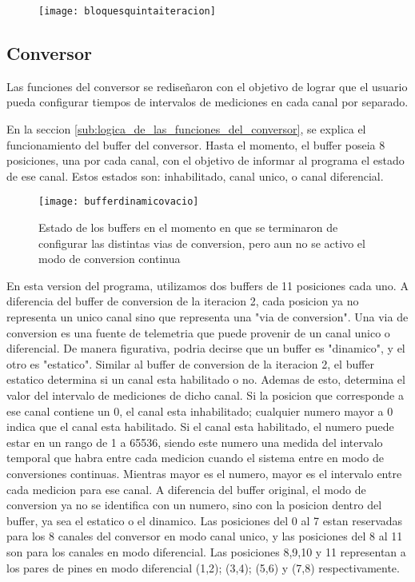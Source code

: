 \begin{figure}[h]
  \centering
  \texttt{[image: bloquesquintaiteracion]}
  \caption{}\label{fig:bloquesquintaiteracion}
\end{figure}

\subsection{Conversor} %
\label{sub:conversor}

Las funciones del conversor se rediseñaron con el objetivo de lograr que el usuario pueda configurar tiempos de intervalos de mediciones en cada canal por separado.

En la seccion \ref{sub:logica_de_las_funciones_del_conversor}, se explica el funcionamiento del buffer del conversor. Hasta el momento, el buffer poseia 8 posiciones, una por cada canal, con el objetivo de informar al programa el estado de ese canal. Estos estados son: inhabilitado, canal unico, o canal diferencial.

\begin{figure}[h]
  \centering
  \texttt{[image: bufferdinamicovacio]}
  \caption{Estado de los buffers en el momento en que se terminaron de configurar las distintas vias de conversion, pero aun no se activo el modo de conversion continua}\label{fig:bufferdinamicovacio}
\end{figure}

En esta version del programa, utilizamos dos buffers de 11 posiciones cada uno. A diferencia del buffer de conversion de la iteracion 2, cada posicion ya no representa un unico canal sino que representa una "via de conversion". Una via de conversion es una fuente de telemetria que puede provenir de un canal unico o diferencial.
De manera figurativa, podria decirse que un buffer es "dinamico", y el otro es "estatico". Similar al buffer de conversion de la iteracion 2, el buffer estatico determina si un canal esta habilitado o no. Ademas de esto, determina el valor del intervalo de mediciones de dicho canal. Si la posicion que corresponde a ese canal contiene un 0, el canal esta inhabilitado; cualquier numero mayor a 0 indica que el canal esta habilitado. Si el canal esta habilitado, el numero puede estar en un rango de 1 a 65536, siendo este numero una medida del intervalo temporal que habra entre cada medicion cuando el sistema entre en modo de conversiones continuas. Mientras mayor es el numero, mayor es el intervalo entre cada medicion para ese canal.
A diferencia del buffer original, el modo de conversion ya no se identifica con un numero, sino con la posicion dentro del buffer, ya sea el estatico o el dinamico. Las posiciones del 0 al 7 estan reservadas para los 8 canales del conversor en modo canal unico, y las posiciones del 8 al 11 son para los canales en modo diferencial. Las posiciones 8,9,10 y 11 representan a los pares de pines en modo diferencial (1,2); (3,4); (5,6) y (7,8) respectivamente. 


